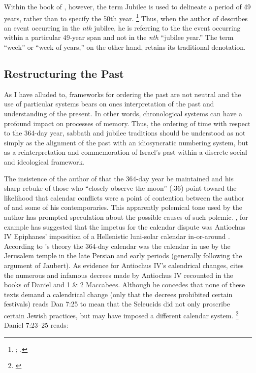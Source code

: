 Within the book of \jub, however, the term Jubilee is used to delineate a period of 49 years, rather than to specify the 50th year.%
    \footnote{%
        \cite[524--525]{vanderkam-b_vanderkam2000};
        \cite[234]{bergsma2007}.}
Thus, when the author of \jub describes an event occurring in the \emph{nth} jubilee, he is referring to the the event occurring within a particular 49-year span and not in the \emph{nth} ``jubilee year.'' The term ``week'' or ``week of years,'' on the other hand, retains its traditional denotation.

\subsection{Restructuring the Past}
As I have alluded to, frameworks for ordering the past are not neutral and the use of particular systems bears on ones interpretation of the past and understanding of the present. In other words, chronological systems can have a profound impact on processes of memory. Thus, the ordering of time with respect to the 364-day year, sabbath and jubilee traditions should be understood as not simply as the alignment of the past with an idiosyncratic numbering system, but as a reinterpretation and commemoration of Israel's past within a discrete social and ideological framework. 

The insistence of the author of \jub that the 364-day year be maintained and his sharp rebuke of those who ``closely observe the moon'' (:36) point toward the likelihood that calendar conflicts were a point of contention between the author of \jub and some of his contemporaries. This apparently polemical tone used by the author has prompted speculation about the possible causes of such polemic. \vanderkam, for example has suggested that the impetus for the calendar dispute was Antiochus IV Epiphanes' imposition of a Hellenistic luni-solar calendar in-or-around . According to \vanderkam's theory the 364-day calendar was the calendar in use by the Jerusalem temple in the late Persian and early \secondtemple periods (generally following the argument of Jaubert). As evidence for Antiochus IV's calendrical changes, \vanderkam cites the numerous and infamous decrees made by Antiochus IV recounted in the books of Daniel and 1 \& 2 Maccabees. Although he concedes that none of these texts demand a calendrical change (only that the decrees prohibited certain festivals) \vanderkam reads Dan 7:25 to mean that the Seleucids did not only proscribe certain Jewish practices, but may have imposed a different calendar system.%
    \footnote{\cite[59--60; 68--69]{vanderkam_jsj1981}}
Daniel 7:23--25 reads:

